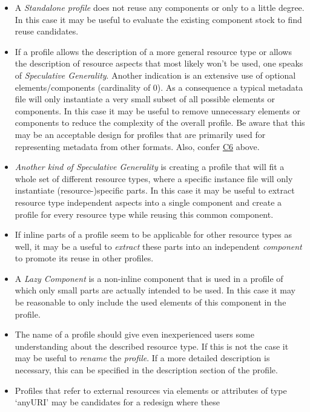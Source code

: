 \documentclass[]{article}
\providecommand{\tightlist}{%
  \setlength{\itemsep}{0pt}\setlength{\parskip}{0pt}}
\begin{document}
\begin{itemize}
\tightlist
\item
  A \emph{Standalone profile} does not reuse any components or only to a
  little degree. In this case it may be useful to evaluate the existing
  component stock to find reuse candidates.
\item
  If a profile allows the description of a more general resource type or
  allows the description of resource aspects that most likely won't be
  used, one speaks of \emph{Speculative Generality}. Another indication
  is an extensive use of optional elements/components (cardinality of
  0). As a consequence a typical metadata file will only instantiate a
  very small subset of all possible elements or components. In this case
  it may be useful to remove unnecessary elements or components to
  reduce the complexity of the overall profile. Be aware that this may
  be an acceptable design for profiles that are primarily used for
  representing metadata from other formats. Also, confer
  \href{/modelling_component_metadata/components.md\#c6}{C6} above.
\item
  \emph{Another kind of Speculative Generality} is creating a profile
  that will fit a whole set of different resource types, where a
  specific instance file will only instantiate (resource-)specific
  parts. In this case it may be useful to extract resource type
  independent aspects into a single component and create a profile for
  every resource type while reusing this common component.
\item
  If inline parts of a profile seem to be applicable for other resource
  types as well, it may be a useful to \emph{extract} these parts into
  an independent \emph{component} to promote its reuse in other
  profiles.
\item
  A \emph{Lazy Component} is a non-inline component that is used in a
  profile of which only small parts are actually intended to be used. In
  this case it may be reasonable to only include the used elements of
  this component in the profile.
\item
  The name of a profile should give even inexperienced users some
  understanding about the described resource type. If this is not the
  case it may be useful to \emph{rename} the \emph{profile}. If a more
  detailed description is necessary, this can be specified in the
  description section of the profile.
\item
  Profiles that refer to external resources via elements or attributes
  of type `anyURI' may be candidates for a redesign where these

\end{itemize}
\end{document}
